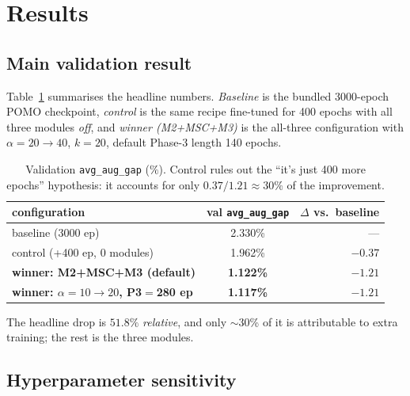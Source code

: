 \documentclass[11pt,a4paper]{article}
\begin{document}
\section{Results}
\label{sec:results}

\subsection{Main validation result}

Table~\ref{tab:main} summarises the headline numbers. \textit{Baseline} is
the bundled 3000-epoch POMO checkpoint, \textit{control} is the same recipe
fine-tuned for 400 epochs with all three modules \emph{off}, and
\textit{winner (M2+MSC+M3)} is the all-three configuration with
$\alpha=20\!\to\!40$, $k=20$, default Phase-3 length 140 epochs.

\begin{table}[t]
\centering
\caption{Validation \texttt{avg\_aug\_gap} ($\%$). Control rules out the
``it's just 400 more epochs'' hypothesis: it accounts for only
$0.37/1.21 \approx 30\%$ of the improvement.}
\label{tab:main}
\small
\begin{tabular}{l c r}
\toprule
configuration & val \texttt{avg\_aug\_gap} & $\Delta$ vs.\ baseline\\
\midrule
baseline (3000 ep)                          & 2.330\% & --- \\
control (+400 ep, 0 modules)                & 1.962\% & $-0.37$ \\
\rowcolor{sdmblue!10}
\textbf{winner: M2+MSC+M3 (default)}        & \textbf{1.122\%} & $\mathbf{-1.21}$ \\
\rowcolor{sdmblue!10}
\textbf{winner: $\alpha\!=\!10\!\to\!20$, P3$=$280 ep}  & \textbf{1.117\%} & $\mathbf{-1.21}$ \\
\bottomrule
\end{tabular}
\end{table}

The headline drop is $51.8\%$ \emph{relative}, and only
$\sim$30\% of it is attributable to extra training; the rest is the three
modules.

\subsection{Hyperparameter sensitivity}
\label{sec:sens}
\end{document}
